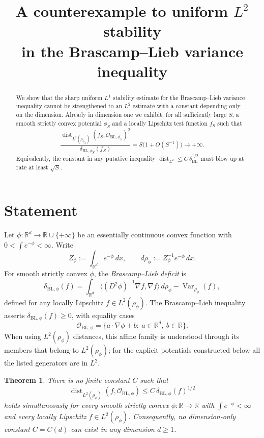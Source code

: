 \documentclass{article}
\title{A counterexample to uniform $L^2$ stability\\
       in the Brascamp--Lieb variance inequality}
\author{}
\date{}
\newtheorem{theorem}{Theorem}[section]
\theoremstyle{remark}
\DeclareMathOperator{\Var}{Var}
\DeclareMathOperator{\dist}{dist}
\begin{document}
\maketitle

\begin{abstract}
We show that the sharp uniform $L^1$ stability estimate for the Brascamp--Lieb
variance inequality cannot be strengthened to an $L^2$ estimate with a constant
depending only on the dimension. Already in dimension one we exhibit, for all
sufficiently large $S$, a smooth strictly convex potential $\phi_S$ and a
locally Lipschitz test function $f_S$ such that
\[
  \frac{\dist_{L^2(\rho_{\phi_S})}(f_S,\mathcal O_{\mathrm{BL},\phi_S})^2}
       {\delta_{\mathrm{BL},\phi_S}(f_S)}
  = S\bigl(1+O(S^{-1})\bigr)\to+\infty.
\]
Equivalently, the constant in any putative inequality
$\dist_{L^2}\le C\,\delta_{\mathrm{BL}}^{1/2}$ must blow up at rate at least
$\sqrt S$.
\end{abstract}

\section{Statement}

Let $\phi:\mathbb R^d\to\mathbb R\cup\{+\infty\}$ be an essentially continuous
convex function with $0<\int e^{-\phi}<\infty$. Write
\[
  Z_\phi := \int_{\mathbb R^d} e^{-\phi}\,dx, \qquad
  d\rho_\phi := Z_\phi^{-1}e^{-\phi}\,dx.
\]
For smooth strictly convex $\phi$, the \emph{Brascamp--Lieb deficit} is
\[
  \delta_{\mathrm{BL},\phi}(f)
  =
  \int_{\mathbb R^d}\bigl\langle (D^2\phi)^{-1}\nabla f,\nabla f\bigr\rangle\,d\rho_\phi
  -\Var_{\rho_\phi}(f),
\]
defined for any locally Lipschitz $f\in L^2(\rho_\phi)$. The
Brascamp--Lieb inequality \cite{BL76} asserts $\delta_{\mathrm{BL},\phi}(f)\ge 0$,
with equality cases
\[
  \mathcal O_{\mathrm{BL},\phi}
  =
  \{a\cdot \nabla\phi+b:\ a\in\mathbb R^d,\ b\in\mathbb R\}.
\]
When using $L^2(\rho_\phi)$ distances, this affine family is understood through
its members that belong to $L^2(\rho_\phi)$; for the explicit potentials
constructed below all the listed generators are in $L^2$.

\begin{theorem}\label{thm:l2-fails}
There is no finite constant $C$ such that
\begin{equation}\label{eq:would-be-stability}
  \dist_{L^2(\rho_\phi)}(f,\mathcal O_{\mathrm{BL},\phi})
  \le C\,\delta_{\mathrm{BL},\phi}(f)^{1/2}
\end{equation}
holds simultaneously for every smooth strictly convex
$\phi:\mathbb R\to\mathbb R$ with $\int e^{-\phi}<\infty$ and every locally
Lipschitz $f\in L^2(\rho_\phi)$. Consequently, no dimension-only constant
$C=C(d)$ can exist in any dimension $d\ge 1$.
\end{theorem}
\end{document}
